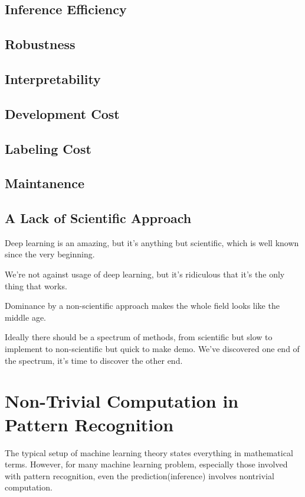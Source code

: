 \documentclass[11pt]{article} 	%
\theoremstyle{definition}
\begin{document}
\subsection{Inference Efficiency}

\subsection{Robustness}

\subsection{Interpretability}

\subsection{Development Cost}

\subsection{Labeling Cost}

\subsection{Maintanence}

\subsection{A Lack of Scientific Approach}

Deep learning is an amazing, but it's anything but scientific, which is well known since the very beginning.

We're not against usage of deep learning, but it's ridiculous that it's the only thing that works.

Dominance by a non-scientific approach makes the whole field looks like the middle age.

Ideally there should be a spectrum of methods, from scientific but slow to implement to non-scientific but quick to make demo. We've discovered one end of the spectrum, it's time to discover the other end.




\section{Non-Trivial Computation  in Pattern Recognition}

The typical setup of machine learning theory states everything in mathematical terms.
However, for many machine learning problem, especially those involved with pattern recognition, even the prediction(inference) involves nontrivial computation.
\end{document}
